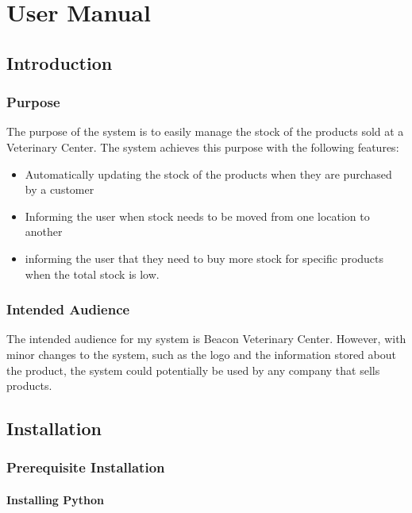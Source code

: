 \chapter{User Manual}

\section{Introduction}

\subsection{Purpose}

The purpose of the system is to easily manage the stock of the products sold at a Veterinary Center. The system achieves this purpose with the following features:

\begin{itemize}
\item{Automatically updating the stock of the products when they are purchased by a customer}
\item{Informing the user when stock needs to be moved from one location to another}
\item{informing the user that they need to buy more stock for specific products when the total stock is low.}
\end{itemize}

\subsection{Intended Audience}

The intended audience for my system is Beacon Veterinary Center. However, with minor changes to the system, such as the logo and the information stored about the product, the system could potentially be used by any company that sells products. 

\section{Installation}

\subsection{Prerequisite Installation}


\subsubsection{Installing Python}

